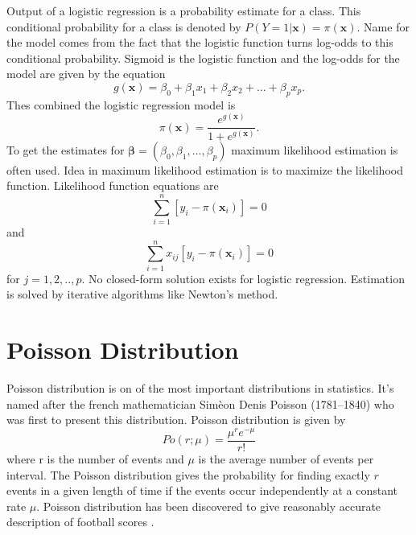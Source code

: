 Output of a logistic regression is a probability estimate for a class. This conditional probability for a class is denoted by $P ( Y = 1 | \mathbf { x } ) = \pi ( \mathbf { x } )$. Name for the model comes from the fact that the logistic function turns log-odds to this conditional probability. Sigmoid is the logistic function and the log-odds for the model are given by the equation
\begin{equation}
    g ( \mathbf { x } ) = \beta _ { 0 } + \beta _ { 1 } x _ { 1 } + \beta _ { 2 } x _ { 2 } + \ldots + \beta _ { p } x _ { p }.
\end{equation}
Thes combined the logistic regression model is
\begin{equation}
    \pi ( \mathbf { x } ) = \frac { e ^ { g ( \mathbf { x } ) } } { 1 + e ^ { g ( \mathbf { x } ) } }.
\end{equation}
To get the estimates for $\boldsymbol { \beta } = \left( \beta _ { 0 } , \beta _ { 1 } , \ldots , \beta _ { p } \right)$ maximum likelihood estimation is often used. Idea in maximum likelihood estimation is to maximize the likelihood function. Likelihood function equations are
\begin{equation}
    \sum _ { i = 1 } ^ { n } \left[ y _ { i } - \pi \left( \mathbf { x } _ { i } \right) \right] = 0
\end{equation}
and
\begin{equation}
    \sum _ { i = 1 } ^ { n } x _ { i j } \left[ y _ { i } - \pi \left( \mathbf { x } _ { i } \right) \right] = 0
\end{equation}
for $j=1,2,..,p$. \cite{hosmer2013applied} No closed-form solution exists for logistic regression. Estimation is solved by iterative algorithms like Newton's method.
\section{Poisson Distribution}
Poisson distribution is on of the most important distributions in statistics. It's named after the french mathematician Simèon Denis Poisson (1781–1840) who was first to present this distribution. Poisson distribution is given by
\begin{equation}
    Po ( r ; \mu ) = \frac { \mu ^ { r } e ^ { - \mu } } { r ! }
\end{equation}
where r is the number of events and $\mu$ is the average number of events per interval. The Poisson distribution gives the probability for finding exactly $r$ events in a given length of time if the events occur independently at a constant rate $\mu$. \cite{walck1996hand} Poisson distribution has been discovered to give reasonably accurate description of football scores \cite{maher1982modelling}.
